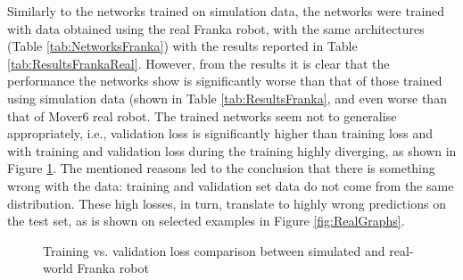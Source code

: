 Similarly to the networks trained on simulation data, the networks were trained with data obtained using the real Franka robot, with the same architectures (Table \ref{tab:NetworksFranka}) with the results reported in Table \ref{tab:ResultsFrankaReal}. However, from the results it is clear that the performance the networks show is significantly worse than that of those trained using simulation data (shown in Table \ref{tab:ResultsFranka}, and even worse than that of Mover6 real robot. The trained networks seem not to generalise appropriately, i.e., validation loss is significantly higher than training loss and with training and validation loss during the training highly diverging, as shown in Figure \ref{fig:HistSimVsReal}. The mentioned reasons led to the conclusion that there is something wrong with the data: training and validation set data do not come from the same distribution. These high losses, in turn, translate to highly wrong predictions on the test set, as is shown on selected examples in Figure \ref{fig:RealGraphs}. 

\begin{figure}
    \centering
    \vfill
    \caption{Training vs. validation loss comparison between simulated and real-world Franka robot}
    \label{fig:HistSimVsReal}
\end{figure}

